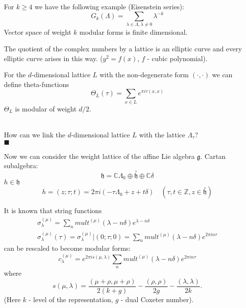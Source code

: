 \documentclass[a4paper,12pt]{article}
\newenvironment{comment}
{\par\noindent{\bf Comment}\\}
{\\\hfill$\scriptstyle\blacksquare$\par}
\theoremstyle{definition} \newtheorem{Def}{Definition}
\newcommand{\co}[1]{\overset{\circ }{#1}}
\begin{document}
For $k\geq 4$ we have the following example (Eisenstein series):
\begin{equation}
  \label{eq:5}
  G_k(\Lambda)=\sum_{\lambda\in \Lambda, \lambda\neq 0} \lambda^{-k}
\end{equation}
Vector space of weight $k$ modular forms is finite dimensional.

The quotient of the complex numbers by a lattice is an elliptic curve and every elliptic curve arises in this way. ($y^2=f(x)$, $f$ - cubic polynomial).

For the $d$-dimensional lattice $L$ with the non-degenerate form $(\cdot,\cdot)$ we can define theta-functions
\begin{equation}
  \label{eq:8}
  \Theta_L (\tau)=\sum_{x\in L}e^{\pi i \tau (x,x)}
\end{equation}
$\Theta_L$ is modular of weight $d/2$.

\begin{comment}
  How can we link the $d$-dimensional lattice $L$ with the lattice $\Lambda_{\tau}$?
\end{comment}

Now we can consider the weight lattice of the affine Lie algebra $\mathfrak{g}$.
Cartan subalgebra:
\begin{equation}
  \label{eq:6}
  \mathfrak{h}=\mathbb{C}\Lambda_0\oplus \co{\mathfrak{h}}\oplus \mathbb{C}\delta
\end{equation}
$h\in \mathfrak{h}$
\begin{equation}
  \label{eq:7}
  h=(z;\tau;t)=2\pi i (-\tau \Lambda_0 +z + t\delta)\quad (\tau,t\in \mathbb{Z}, z\in \co{\mathfrak{h}})
\end{equation}

It is known that string functions
\begin{eqnarray}
  \label{eq:9}
  \sigma^{(\mu)}_{\lambda}=\sum_n mult^{(\mu)}(\lambda-n\delta)e^{\lambda-n\delta}\\
  \sigma^{(\mu)}_{\lambda}(\tau)=\sigma^{(\mu)}_{\lambda}|(0;\tau;0)=\sum_n mult^{(\mu)}(\lambda-n\delta)e^{2\pi i n\tau}
\end{eqnarray}
can be rescaled to become modular forms:
\begin{equation}
  \label{eq:10}
  c^{(\mu)}_{\lambda}=e^{2\pi i s(\mu,\lambda)}\sum_n mult^{(\mu)}(\lambda-n\delta)e^{2\pi i n\tau}
\end{equation}
where
\begin{equation}
  \label{eq:11}
  s(\mu,\lambda)=\frac{(\mu+\rho,\mu+\rho)}{2(k+g)}-\frac{(\rho,\rho)}{2g}-\frac{(\lambda,\lambda)}{2k}.
\end{equation}
(Here $k$ - level of the representation, $g$ - dual Coxeter number).
\end{document}
